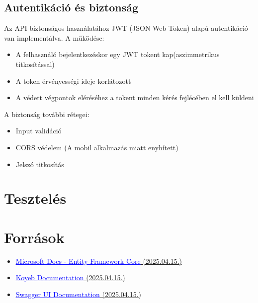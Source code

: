 \documentclass[12pt]{report}
\begin{document}
\section{Autentikáció és biztonság}
Az API biztonságos használatához JWT (JSON Web Token) alapú autentikáció van implementálva. A működése:
\begin{itemize}
  \item A felhasználó bejelentkezéskor egy JWT tokent kap(aszimmetrikus titkosítással)
  \item A token érvényességi ideje korlátozott
  \item A védett végpontok eléréséhez a tokent minden kérés fejlécében el kell küldeni
\end{itemize}

A biztonság további rétegei:
\begin{itemize}
  \item Input validáció
  \item CORS védelem (A mobil alkalmazás miatt enyhített)
  \item Jelszó titkosítás
\end{itemize}

\chapter{Tesztelés}

\chapter{Források}
\begin{itemize}
  \item \href{https://learn.microsoft.com/en-us/ef/core/}{\textcolor{blue}{\underline{Microsoft Docs - Entity Framework Core}}{ (2025.04.15.)}}
  \item \href{https://www.koyeb.com/docs}{\textcolor{blue}{\underline{Koyeb Documentation}}{ (2025.04.15.)}}
  \item \href{https://swagger.io/docs/open-source-tools/swagger-ui/usage/installation/}{\textcolor{blue}{\underline{Swagger UI Documentation}}{ (2025.04.15.)}}
\end{itemize}
\end{document}
